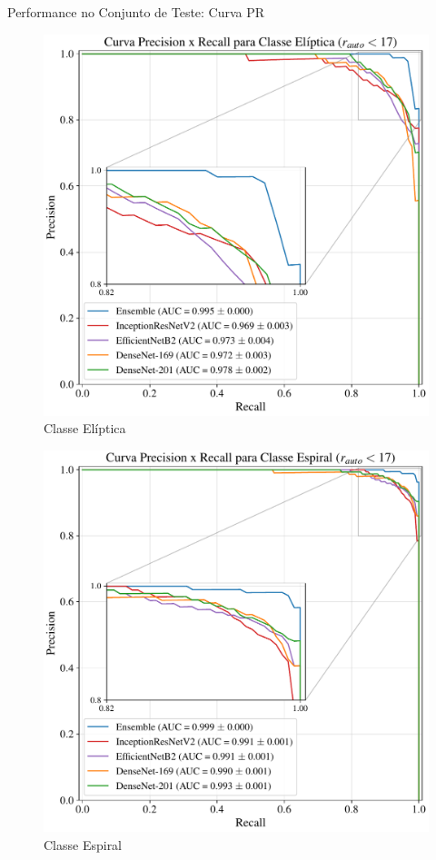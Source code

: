 \documentclass[10pt,xcolor=svgnames]{beamer}
\begin{document}
\begin{frame}{Performance no Conjunto de Teste: Curva PR}
  \begin{minipage}{0.48\textwidth}
    \begin{figure}
      \includegraphics[width=\linewidth]{figures/pr_mn170_E.pdf}
      \caption{Classe Elíptica}
    \end{figure}
  \end{minipage}\hfill
  \begin{minipage}{0.48\textwidth}
    \begin{figure}
      \includegraphics[width=\linewidth]{figures/pr_mn170_S.pdf}
      \caption{Classe Espiral}
    \end{figure}
  \end{minipage}
\end{frame}
\end{document}
